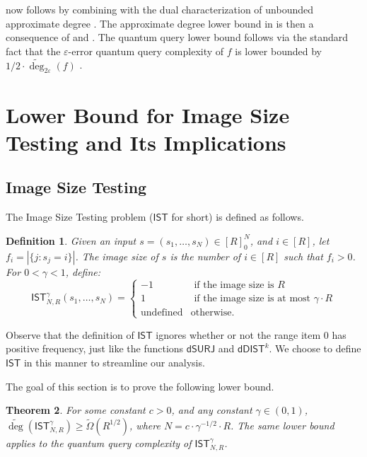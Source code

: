 \documentclass[11pt, letterpaper, fleqn]{article}
\newtheorem{theorem}{Theorem}
\newtheorem{definition}[theorem]{Definition}
\theoremstyle{plain}
\newcommand{\SE}{\mathsf{ IST}}
\newcommand{\dumSURJ}{\mathsf{dSURJ}}
\newcommand{\dumDIST}{\mathsf{dDIST}}
\newcommand{\tOmega}{\tilde{\Omega}}
\newcommand{\eps}{\varepsilon}
\newcommand{\adeg}{\widetilde{\operatorname{deg}}}
\begin{document}
 now follows by combining  with the dual characterization of unbounded approximate degree . The approximate degree lower bound in  is then a consequence of  and . The quantum query lower bound follows via the standard fact
that the $\eps$-error quantum query complexity of $f$ is lower bounded by $1/2 \cdot \adeg_{2\eps}(f)$ \cite{beals}.



 
\section{Lower Bound for Image Size Testing and Its Implications}
\label{s:final}
\subsection{Image Size Testing} 

The Image Size Testing problem ($\SE$ for short) is defined as follows. 

\begin{definition}
Given an input $s=(s_1, \dots, s_N) \in [R]_0^N$, and $i \in [R]$, let
$f_i = |\{j \colon s_j=i\}|$. The \emph{image size} of $s$
is the number of $i \in [R]$ such that $f_i > 0$. For $0 < \gamma < 1$, define:
$$\SE_{N, R}^{\gamma}(s_1, \dots, s_N) = \begin{cases} 
-1 & \text{ if the image size is } R\\
1 & \text{ if the image size is at most } \gamma \cdot R\\
\text{undefined} & \text{otherwise}.\end{cases}$$
\end{definition}

Observe that the definition of $\SE$ ignores whether or not 
the range item 0 has positive frequency, just like the functions
$\dumSURJ$ and $\dumDIST^k$. We choose
to define $\SE$ in this manner to streamline
our analysis.


The goal of this section is to prove the following lower bound.

\begin{theorem} \label{sethm}
 For some constant $c > 0$, and any constant $\gamma \in (0, 1)$, $\adeg\left(\SE_{N, R}^{\gamma}\right) \ge \tOmega(R^{1/2})$, where $N = c \cdot \gamma^{-1/2} \cdot R$.
 The same lower bound applies to the quantum query complexity of $\SE_{N, R}^{\gamma}$.
 \end{theorem}
\end{document}
